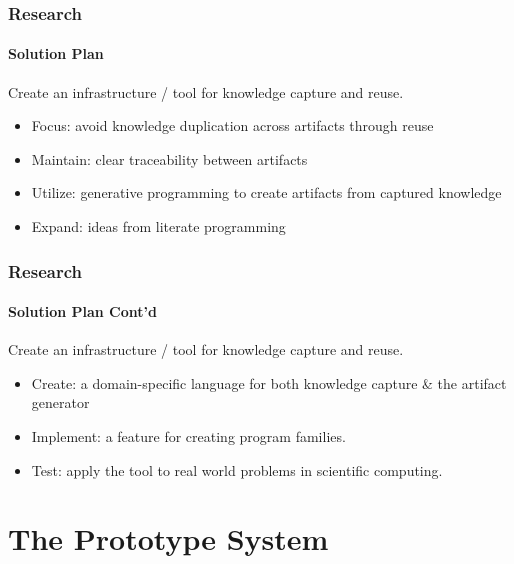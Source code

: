 \documentclass{beamer}
\begin{document}


\begin{frame}

\frametitle{Research}
\framesubtitle{Solution Plan}

Create an infrastructure / tool for knowledge capture and reuse.

\begin{itemize}
\item Focus: avoid knowledge duplication across artifacts through reuse%
\item Maintain: clear traceability between artifacts
\item Utilize: generative programming to create artifacts from captured
	knowledge
\item Expand: ideas from literate programming

\end{itemize}
\end{frame}



\begin{frame}

\frametitle{Research}
\framesubtitle{Solution Plan Cont'd}

Create an infrastructure / tool for knowledge capture and reuse.

\begin{itemize}
\item Create: a domain-specific language for both knowledge capture \& the 
	artifact	generator
\item Implement: a feature for creating program families. %
\item Test: apply the tool to real world problems in scientific computing.


\end{itemize}
\end{frame}


\section[Prototype]{The Prototype System}
\end{document}
